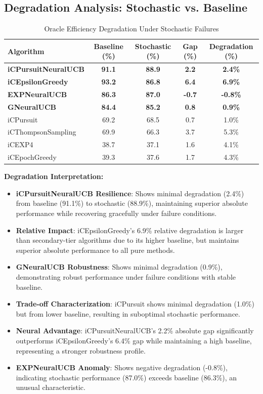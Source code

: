 \documentclass[12pt,a4paper]{article}
\newcommand{\primarytext}[1]{\textcolor{primaryblue}{\textbf{#1}}}
\newcommand{\secondarytext}[1]{\textcolor{secondaryblue}{\textbf{#1}}}
\newcommand{\success}[1]{\textcolor{accentgreen}{\textbf{#1}}}
\newcommand{\legacy}[1]{\textcolor{legacycolor}{\textbf{#1}}}
\newcommand{\neural}[1]{\textcolor{neuralcolor}{\textbf{#1}}}
\begin{document}
\subsection{Degradation Analysis: Stochastic vs. Baseline}

\begin{table}[H]
\centering
\caption{Oracle Efficiency Degradation Under Stochastic Failures}
\label{tab:degradation-analysis}
\begin{tabular}{@{}lcccc@{}}
\toprule
\textbf{Algorithm} & \textbf{Baseline (\%)} & \textbf{Stochastic (\%)} & \textbf{Gap (\%)} & \textbf{Degradation (\%)} \\
\midrule
\neural{iCPursuitNeuralUCB}   & \neural{91.1} & \neural{88.9} & \neural{2.2} & \neural{2.4\%} \\
\primarytext{iCEpsilonGreedy}   & \primarytext{93.2} & \primarytext{86.8} & \primarytext{6.4} & \primarytext{6.9\%} \\
\legacy{EXPNeuralUCB}           & \legacy{86.3} & \legacy{87.0} & \legacy{-0.7} & \legacy{-0.8\%} \\
\neural{GNeuralUCB}            & \neural{84.4} & \neural{85.2} & \neural{0.8} & \neural{0.9\%} \\
iCPursuit                       & 69.2 & 68.5 & 0.7 & 1.0\% \\
iCThompsonSampling              & 69.9 & 66.3 & 3.7 & 5.3\% \\
iCEXP4                          & 38.7 & 37.1 & 1.6 & 4.1\% \\
iCEpochGreedy                   & 39.3 & 37.6 & 1.7 & 4.3\% \\
\bottomrule
\end{tabular}
\end{table}

\textbf{Degradation Interpretation:}
\begin{itemize}
\item \neural{iCPursuitNeuralUCB Resilience}: Shows minimal degradation (2.4\%) from baseline (91.1\%) to stochastic (88.9\%), maintaining superior absolute performance while recovering gracefully under failure conditions.
\item \primarytext{Relative Impact}: iCEpsilonGreedy's 6.9\% relative degradation is larger than secondary-tier algorithms due to its higher baseline, but maintains superior absolute performance to all pure methods.
\item \neural{GNeuralUCB Robustness}: Shows minimal degradation (0.9\%), demonstrating robust performance under failure conditions with stable baseline.
\item \secondarytext{Trade-off Characterization}: iCPursuit shows minimal degradation (1.0\%) but from lower baseline, resulting in suboptimal stochastic performance.
\item \success{Neural Advantage}: iCPursuitNeuralUCB's 2.2\% absolute gap significantly outperforms iCEpsilonGreedy's 6.4\% gap while maintaining a high baseline, representing a stronger robustness profile.
\item \legacy{EXPNeuralUCB Anomaly}: Shows negative degradation (-0.8\%), indicating stochastic performance (87.0\%) exceeds baseline (86.3\%), an unusual characteristic.
\end{itemize}
\end{document}
